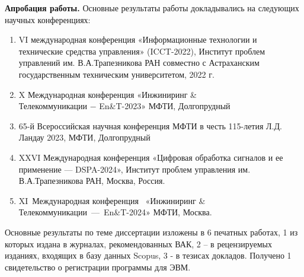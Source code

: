 \textbf{Апробация работы.} Основные результаты работы докладывались на
следующих научных конференциях:
	\begin{enumerate}[beginpenalty=10000]
		\item VI международная конференция
		«Информационные технологии и технические средства управления» (ICCT-2022), Институт проблем
		управлений им. В.А.Трапезникова РАН совместно с Астраханским государственным
		техническим университетом, 2022 г.
		\item X Международная конференция  «Инжиниринг  \& \\ Телекоммуникации − En\&T-2023» МФТИ, Долгопрудный
		\item 65-й Всероссийская научная конференция
		МФТИ в честь 115-летия Л.Д. Ландау 2023, МФТИ, Долгопрудный
		\item XXVI Международная конференция
		«Цифровая обработка сигналов и ее применение — DSPA-2024», Институт проблем управления им. В.А.Трапезникова РАН, Москва, Россия.
		\item XI Международная конференция  «Инжиниринг \& \\ Телекоммуникации — En\&T-2024» МФТИ, Москва.
	\end{enumerate}
	
{\publications} Основные результаты по теме диссертации изложены в 6 печатных работах, 1 из которых издана в журналах, рекомендованных ВАК, 2 –
в рецензируемых изданиях, входящих в базу данных Scopus, 3 - в тезисах докладов. Получено 1 свидетельство о регистрации программы для ЭВМ.




